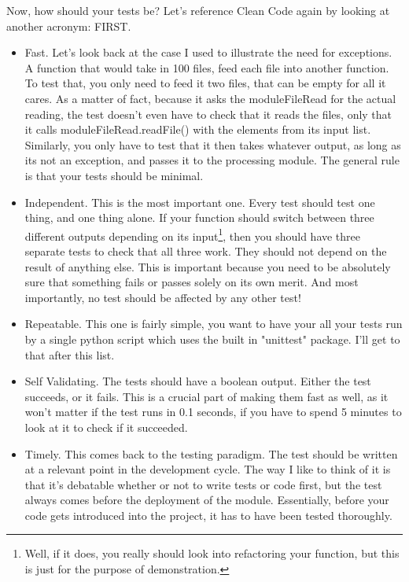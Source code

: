 \documentclass[10pt,a4paper]{article}
\begin{document}
Now, how should your tests be? Let's reference Clean Code again by looking at another acronym: FIRST.

\begin{itemize} 
\item Fast. Let's look back at the case I used to illustrate the need for exceptions. A function that would take in 100 files, feed each file into another function. To test that, you only need to feed it two files, that can be empty for all it cares. As a matter of fact, because it asks the moduleFileRead for the actual reading, the test doesn't even have to check that it reads the files, only that it calls moduleFileRead.readFile() with the elements from its input list. Similarly, you only have to test that it then takes whatever output, as long as its not an exception, and passes it to the processing module. The general rule is that your tests should be minimal.
\item Independent. This is the most important one. Every test should test one thing, and one thing alone. If your function should switch between three different outputs depending on its input\footnote{Well, if it does, you really should look into refactoring your function, but this is just for the purpose of demonstration.}, then you should have three separate tests to check that all three work. They should not depend on the result of anything else. This is important because you need to be absolutely sure that something fails or passes solely on its own merit. And most importantly, no test should be affected by any other test!
\item Repeatable. This one is fairly simple, you want to have your all your tests run by a single python script which uses the built in "unittest" package. I'll get to that after this list.
\item Self Validating. The tests should have a boolean output. Either the test succeeds, or it fails. This is a crucial part of making them fast as well, as it won't matter if the test runs in 0.1 seconds, if you have to spend 5 minutes to look at it to check if it succeeded.
\item Timely. This comes back to the testing paradigm. The test should be written at a relevant point in the development cycle. The way I like to think of it is that it's debatable whether or not to write tests or code first, but the test always comes before the deployment of the module. Essentially, before your code gets introduced into the project, it has to have been tested thoroughly.  
\end{itemize}
\end{document}
